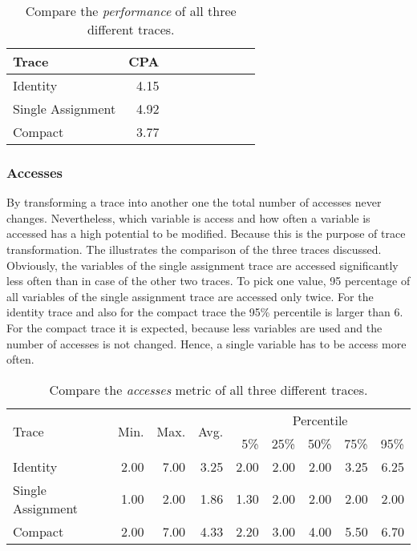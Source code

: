 \documentclass[onecolumn, openright, master, english, signatures]{dbrgrptt}
\begin{document}
\begin{table}[!ht]
  \centering
  \begin{tabular}{lrrrrrrrr}
    \hline
    Trace & \ac{CPA} \tabularnewline
    \hline
    Identity          & 4.15 \\
    Single Assignment & 4.92 \\
    Compact           & 3.77 \\
    \hline
  \end{tabular}
  \caption{Compare the \emph{performance} of all three different \ac{trace}s.}
  \label{tab:summarizing-example-performance}
\end{table}

\subsubsection{Accesses}

By transforming a \ac{trace} into another one the total number of accesses never changes. Nevertheless, which variable is access and how often a variable is accessed has a high potential to be modified. Because this is the purpose of \ac{trace} transformation. The  illustrates the comparison of the three \ac{trace}s discussed. Obviously, the variables of the single assignment \ac{trace} are accessed significantly less often than in case of the other two \ac{trace}s. To pick one value, 95 percentage of all variables of the single assignment \ac{trace} are accessed only twice. For the identity \ac{trace} and also for the compact \ac{trace} the 95\% percentile is larger than 6. For the compact \ac{trace} it is expected, because less variables are used and the number of accesses is not changed. Hence, a single variable has to be access more often.

\begin{table}[!ht]
  \centering
  \begin{tabular}{lrrrrrrrr}
    \hline
    \multirow{2}{*}{Trace} & \multirow{2}{*}{Min.} & \multirow{2}{*}{Max.} & \multirow{2}{*}{Avg.} & \multicolumn{5}{c}{Percentile} \tabularnewline
    & & & & 5\% & 25\% & 50\% & 75\% & 95\% \tabularnewline
    \hline
    Identity          & 2.00 & 7.00 & 3.25 & 2.00 & 2.00 & 2.00 & 3.25 & 6.25 \\
    Single Assignment & 1.00 & 2.00 & 1.86 & 1.30 & 2.00 & 2.00 & 2.00 & 2.00 \\
    Compact           & 2.00 & 7.00 & 4.33 & 2.20 & 3.00 & 4.00 & 5.50 & 6.70 \\
    \hline
  \end{tabular}
  \caption{Compare the \emph{accesses} metric of all three different \ac{trace}s.}
  \label{tab:summarizing-example-metrics-overview-accesses}
\end{table}
\end{document}
